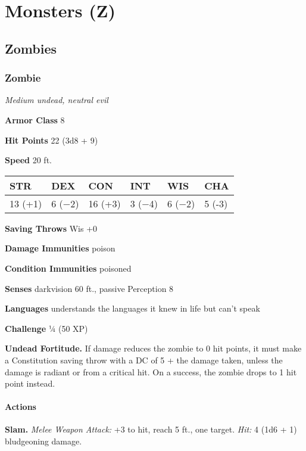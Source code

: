 \documentclass[
]{article}
\date{}
\begin{document}
\hypertarget{monsters-z}{%
\section{Monsters (Z)}\label{monsters-z}}

\hypertarget{zombies}{%
\subsection{Zombies}\label{zombies}}

\hypertarget{zombie}{%
\subsubsection{Zombie}\label{zombie}}

\emph{Medium undead, neutral evil}

\textbf{Armor Class} 8

\textbf{Hit Points} 22 (3d8 + 9)

\textbf{Speed} 20 ft.

\begin{longtable}[]{@{}llllll@{}}
\toprule
STR & DEX & CON & INT & WIS & CHA\tabularnewline
\midrule
\endhead
13 (+1) & 6 (−2) & 16 (+3) & 3 (−4) & 6 (−2) & 5 (-3)\tabularnewline
\bottomrule
\end{longtable}

\textbf{Saving Throws} Wis +0

\textbf{Damage Immunities} poison

\textbf{Condition Immunities} poisoned

\textbf{Senses} darkvision 60 ft., passive Perception 8

\textbf{Languages} understands the languages it knew in life but can't
speak

\textbf{Challenge} ¼ (50 XP)

\textbf{Undead Fortitude.} If damage reduces the zombie to 0 hit points,
it must make a Constitution saving throw with a DC of 5 + the damage
taken, unless the damage is radiant or from a critical hit. On a
success, the zombie drops to 1 hit point instead.

\hypertarget{actions}{%
\paragraph{Actions}\label{actions}}

\textbf{Slam.} \emph{Melee Weapon Attack:} +3 to hit, reach 5 ft., one
target. \emph{Hit:} 4 (1d6 + 1) bludgeoning damage.
\end{document}

